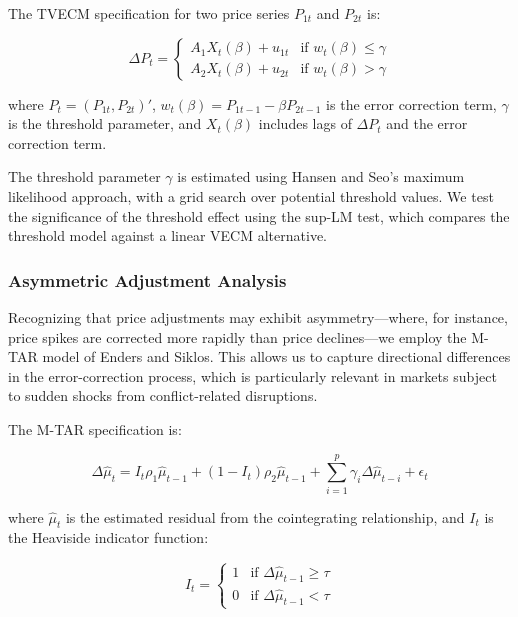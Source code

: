 The TVECM specification for two price series $P_{1t}$ and $P_{2t}$ is:

\begin{equation}
\Delta P_t = 
\begin{cases}
A_1 X_t(\beta) + u_{1t} & \text{if } w_t(\beta) \leq \gamma \\
A_2 X_t(\beta) + u_{2t} & \text{if } w_t(\beta) > \gamma
\end{cases}
\end{equation}

where $P_t = (P_{1t}, P_{2t})'$, $w_t(\beta) = P_{1t-1} - \beta P_{2t-1}$ is the error correction term, $\gamma$ is the threshold parameter, and $X_t(\beta)$ includes lags of $\Delta P_t$ and the error correction term.

The threshold parameter $\gamma$ is estimated using Hansen and Seo's maximum likelihood approach, with a grid search over potential threshold values. We test the significance of the threshold effect using the sup-LM test, which compares the threshold model against a linear VECM alternative.

\subsubsection{Asymmetric Adjustment Analysis}

Recognizing that price adjustments may exhibit asymmetry—where, for instance, price spikes are corrected more rapidly than price declines—we employ the M-TAR model of Enders and Siklos.\autocite{enders2001} This allows us to capture directional differences in the error-correction process, which is particularly relevant in markets subject to sudden shocks from conflict-related disruptions.

The M-TAR specification is:

\begin{equation}
\Delta \hat{\mu}_t = I_t \rho_1 \hat{\mu}_{t-1} + (1-I_t) \rho_2 \hat{\mu}_{t-1} + \sum_{i=1}^p \gamma_i \Delta \hat{\mu}_{t-i} + \epsilon_t
\end{equation}

where $\hat{\mu}_t$ is the estimated residual from the cointegrating relationship, and $I_t$ is the Heaviside indicator function:

\begin{equation}
I_t = 
\begin{cases}
1 & \text{if } \Delta \hat{\mu}_{t-1} \geq \tau \\
0 & \text{if } \Delta \hat{\mu}_{t-1} < \tau
\end{cases}
\end{equation}

